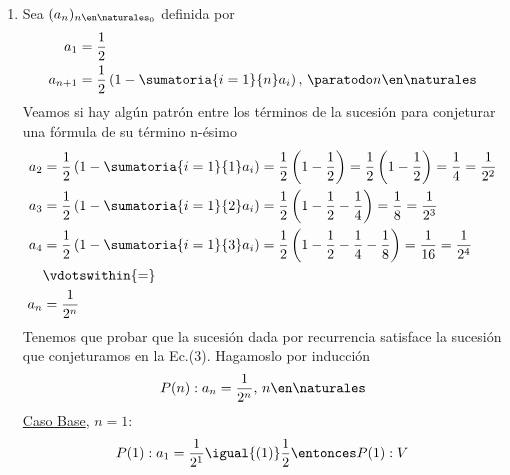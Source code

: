 \begin{enumerate}[label=\roman*)]
  \item Sea $(a_n)_{n \en \naturales _0}$ definida por
        \setcounter{equation}{0}
        \begin{align}
          a_1     & = \frac{1}{2}                                                                      \\
          a_{n+1} & = \frac{1}{2}\left(1 - \sumatoria{i=1}{n} a_i\right),\, \paratodo n \en \naturales
        \end{align}
        Veamos si hay algún patrón entre los términos de la sucesión para conjeturar una fórmula de su término
        n-ésimo
        \begin{align}
          a_2 & = \frac{1}{2}\left(1 - \sumatoria{i=1}{1} a_i\right) = \frac{1}{2}\left(1 - \frac{1}{2}\right) = \frac{1}{2}\left(1 - \frac{1}{2}\right)
          = \frac{1}{4} = \frac{1}{2^2} \nonumber                                                                                                        \\
          a_3 & = \frac{1}{2}\left(1 - \sumatoria{i=1}{2} a_i\right) = \frac{1}{2}\left(1 - \frac{1}{2} - \frac{1}{4}\right)
          = \frac{1}{8} = \frac{1}{2^3} \nonumber                                                                                                        \\
          a_4 & = \frac{1}{2}\left(1 - \sumatoria{i=1}{3} a_i\right)
          = \frac{1}{2}\left(1 - \frac{1}{2} - \frac{1}{4} - \frac{1}{8}\right)
          = \frac{1}{16} = \frac{1}{2^4} \nonumber                                                                                                       \\
              & \vdotswithin{=} \nonumber                                                                                                                \\
          a_n & = \frac{1}{2^n}
        \end{align}
        Tenemos que probar que la sucesión dada por recurrencia satisface la sucesión que conjeturamos en la Ec.(3).
        Hagamoslo por inducción
        \begin{align*}
          P(n): a_n = \frac{1}{2^n}, \, n \en \naturales
        \end{align*}
        \underline{Caso Base}, $n = 1$:
        \begin{align*}
          P(1): a_1 = \frac{1}{2^1} \igual{(1)} \frac{1}{2} \entonces P(1):V \\
        \end{align*}


\end{enumerate}
